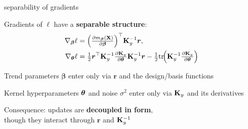 \documentclass[11pt,compress,t,notes=noshow, xcolor=table]{beamer}
\begin{document}
\begin{framei}[sep=L]{separability of gradients}
\item Gradients of $\ell$ have a \textbf{separable structure}:
\begin{align*}
\nabla_{\bm{\beta}} \ell &= 
\Big(\tfrac{\partial m_{\bm{\beta}}(\mathbf{X})}{\partial \bm{\beta}}\Big)^\top \mathbf{K}_y^{-1}\bm{r}, \\
\nabla_{\bm{\theta}} \ell &= 
\tfrac{1}{2}\bm{r}^\top \mathbf{K}_y^{-1}\tfrac{\partial \mathbf{K}_y}{\partial\bm{\theta}}\mathbf{K}_y^{-1}\bm{r}
- \tfrac{1}{2}\mathrm{tr}\!\Big(\mathbf{K}_y^{-1}\tfrac{\partial \mathbf{K}_y}{\partial \bm{\theta}}\Big)
\end{align*}
\item Trend parameters $\bm{\beta}$ enter only via $\bm{r}$ and the design/basis functions
\item Kernel hyperparameters $\bm{\theta}$ and noise $\sigma^2$ enter only via $\mathbf{K}_y$ and its derivatives
\item Consequence: updates are \textbf{decoupled in form}, \\though they interact through $\bm{r}$ and $\mathbf{K}_y^{-1}$
\end{framei}



\endlecture
\end{document}
